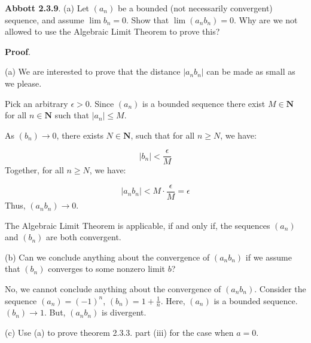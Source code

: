\documentclass[10pt]{article}
\begin{document}
\textbf{Abbott 2.3.9}. (a) Let $\displaystyle ( a_{n})$ be a bounded (not necessarily convergent) sequence, and assume $\displaystyle \lim b_{n} =0$. Show that $\displaystyle \lim ( a_{n} b_{n}) =0$. Why are we not allowed to use the Algebraic Limit Theorem to prove this?



\textbf{Proof}.



(a) We are interested to prove that the distance $\displaystyle |a_{n} b_{n} |$ can be made as small as we please. 



Pick an arbitrary $\displaystyle \epsilon  >0$. Since $\displaystyle ( a_{n})$ is a bounded sequence there exist $\displaystyle M\in \mathbf{N}$ for all $\displaystyle n\in \mathbf{N}$ such that $\displaystyle |a_{n} |\leq M$.



As $\displaystyle ( b_{n})\rightarrow 0$, there exists $\displaystyle N\in \mathbf{N}$, such that for all $\displaystyle n\geq N$, we have:


\begin{equation*}
|b_{n} |< \frac{\epsilon }{M}
\end{equation*}
Together, for all $\displaystyle n\geq N$, we have:


\begin{equation*}
|a_{n} b_{n} |< M\cdot \frac{\epsilon }{M} =\epsilon 
\end{equation*}
Thus, $\displaystyle ( a_{n} b_{n})\rightarrow 0$. 



The Algebraic Limit Theorem is applicable, if and only if, the sequences $\displaystyle ( a_{n})$ and $\displaystyle ( b_{n})$ are both convergent.



(b) Can we conclude anything about the convergence of $\displaystyle ( a_{n} b_{n})$ if we assume that $\displaystyle ( b_{n})$ converges to some nonzero limit $\displaystyle b$?



No, we cannot conclude anything about the convergence of $\displaystyle ( a_{n} b_{n})$. Consider the sequence $\displaystyle ( a_{n}) =( -1)^{n}$, $\displaystyle ( b_{n}) =1+\frac{1}{n}$. Here, $\displaystyle ( a_{n})$ is a bounded sequence. $\displaystyle ( b_{n})\rightarrow 1$. But, $\displaystyle ( a_{n} b_{n})$ is divergent.



(c) Use (a) to prove theorem 2.3.3. part (iii) for the case when $\displaystyle a=0$.
\end{document}

